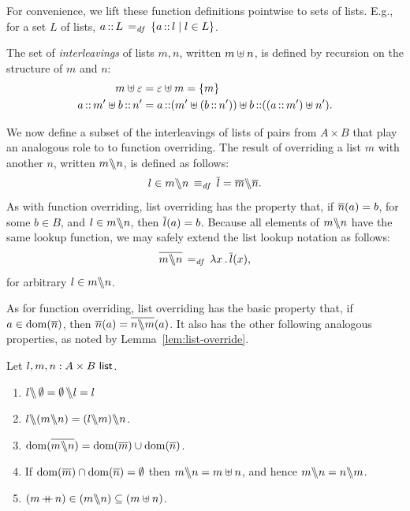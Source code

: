 \documentclass[11pt]{report}
\begin{document}
For convenience, we lift these function definitions pointwise to sets of lists. E.g., for a set $L$ of lists, $a \lcons L \eqdef \setof{a \lcons l}{l \in L}$. 

The set of \emph{interleavings} of lists $m,n$, written $m \merge n$, is defined by recursion on the structure of $m$ and $n$: \begin{align*}
	m \merge \lnil & = \lnil \merge m = \set{m} \\ 
	a \lcons m' \merge b \lcons n' & = a \lcons (m' \merge (b\lcons n')) \uplus b \lcons ((a \lcons m') \merge n').
\end{align*}

We now define a subset of the interleavings of lists of pairs from $A \times B$ that play an analogous role to to function overriding. The result of overriding a list $m$ with another $n$, written $m \override n$, is defined as follows: \[ l \in m \override n \iffdef \funof{l} = \funof{m} \override \funof{n}.\] As with function overriding, list overriding has the property that, if $\funof{n}(a) = b$, for some $b \in B$, and $l \in m \override n$, then $\funof{l}(a) = b$. Because all elements of $m \override n$ have the same lookup function, we may safely extend the list lookup notation as follows: \[ \funof{m \override n} \eqdef \fun{x} \funof{l}(x),\] for arbitrary $l \in m \override n$. 

As for function overriding, list overriding has the basic property that, if $a \in \dom{\funof{n}}$, then $\funof{n}(a) = \funof{n \override m}(a)$. It also has the other following analogous properties, as noted by Lemma~\ref{lem:list-override}. 
\begin{lemma}
    \label{lem:list-override}
    Let $l,m,n : \listof{A \times B}$. 
    \begin{enumerate}
        \item $l \override \nil = \nil \override l = l$
        \item $l \override (m \override n) = (l \override m) \override n$. 
        \item $\dom{\funof{m \override n}} = \dom{\funof{m}} \cup \dom{\funof{n}}$. 
        \item If $\dom{\funof{m}} \cap \dom{\funof{n}} = \nil$ then $m \override n = m \merge n$, and hence $m \override n = n \override m$. 
        \item $(m \lapp n) \in (m \override n) \subseteq (m \merge n)$.
    \end{enumerate}
\end{lemma}
\end{document}
